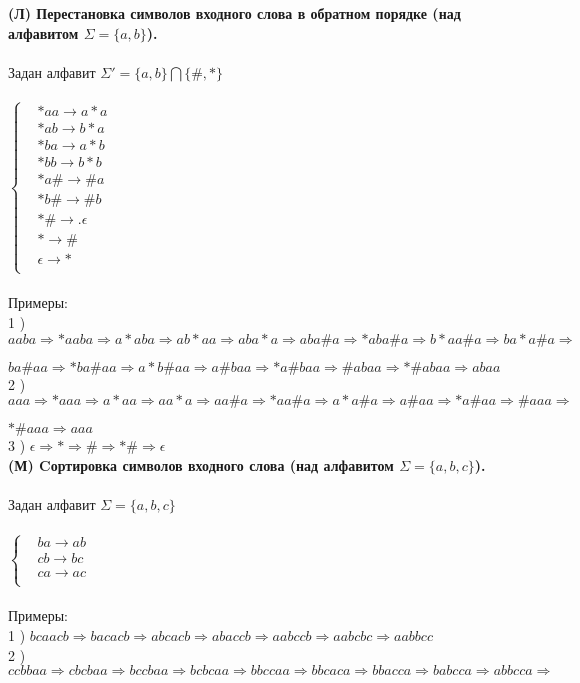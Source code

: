 \documentclass[a4paper,25pt]{book}
\begin{document}
\textbf{(Л)  Перестановка символов входного слова в обратном порядке (над алфавитом $\Sigma = \{a, b \}$).}\\\\
Задан алфавит $\Sigma' = \{a, b \} \bigcap \{\#, *\}$\\\\
$ \left\{
\begin{aligned}
&*aa \rightarrow a*a\\
&*ab \rightarrow b*a\\
&*ba \rightarrow a*b\\
&*bb \rightarrow b*b\\
&*a\# \rightarrow \#a\\
&*b\# \rightarrow \#b\\
&*\# \rightarrow .\epsilon\\
&* \rightarrow \#\\
&\epsilon \rightarrow *\\
\end{aligned}
\right.$\\\\
Примеры:\\
1 ) $aaba \Rightarrow *aaba \Rightarrow a*aba \Rightarrow ab*aa \Rightarrow  aba*a \Rightarrow aba\#a \Rightarrow *aba\#a \Rightarrow b*aa\#a \Rightarrow  ba*a\#a \Rightarrow$ 

$ba\#aa \Rightarrow *ba\#aa \Rightarrow a*b\#aa \Rightarrow  a\#baa \Rightarrow *a\#baa \Rightarrow \#abaa \Rightarrow *\#abaa \Rightarrow  abaa$\\
2 ) $aaa \Rightarrow *aaa \Rightarrow a*aa \Rightarrow aa*a \Rightarrow aa\#a \Rightarrow *aa\#a \Rightarrow a*a\#a \Rightarrow a\#aa \Rightarrow *a\#aa \Rightarrow \#aaa \Rightarrow$

$*\#aaa \Rightarrow aaa$\\
3 ) $\epsilon \Rightarrow * \Rightarrow \# \Rightarrow *\# \Rightarrow\epsilon$\\


\textbf{(М) Cортировка символов входного слова (над алфавитом
$\Sigma = \{a, b, c \}$).}\\\\
Задан алфавит $\Sigma = \{a, b, c \}$\\\\
$ \left\{
\begin{aligned}
&ba \rightarrow ab\\
&cb \rightarrow bc\\
&ca \rightarrow ac\\
\end{aligned}
\right.$
\\\\
Примеры:\\
1 ) $bcaacb\Rightarrow bacacb\Rightarrow abcacb\Rightarrow abaccb\Rightarrow aabccb\Rightarrow aabcbc\Rightarrow aabbcc$\\
2 ) $ccbbaa\Rightarrow cbcbaa\Rightarrow bccbaa\Rightarrow bcbcaa\Rightarrow bbccaa\Rightarrow bbcaca\Rightarrow bbacca\Rightarrow babcca\Rightarrow abbcca\Rightarrow$
\end{document}
